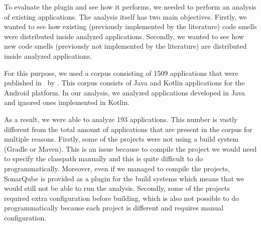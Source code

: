 
To evaluate the plugin and see how it performs, we needed to perform an analysis of existing applications.
The analysis itself has two main objectives.
Firstly, we wanted to see how existing (previously implemented by the literature) code smells were distributed
inside analyzed applications.
Secondly, we wanted to see how new code smells (previously not implemented by the literature) are distributed
inside analyzed applications.


For this purpose, we used a corpus consisting of 1509 applications that were published in~\cite{kotlin_android_corpus} by
\citeauthor{kotlin_android_corpus}.
This corpus consists of Java and Kotlin applications for the Android platform.
In our analysis, we analyzed applications developed in Java and ignored ones implemented in Kotlin.


As a result, we were able to analyze 193 applications.
This number is vastly different from the total amount of applications that are present in the corpus for multiple reasons.
Firstly, some of the projects were not using a build system (Gradle or Maven).
This is an issue because to compile the project we would need to specify the classpath manually and
this is quite difficult to do programmatically.
Moreover, even if we managed to compile the projects, SonarQube is provided as a plugin for the build systems which means
that we would still not be able to run the analysis.
Secondly, some of the projects required extra configuration before building, which is also not possible to do
programmatically because each project is different and requires manual configuration.
